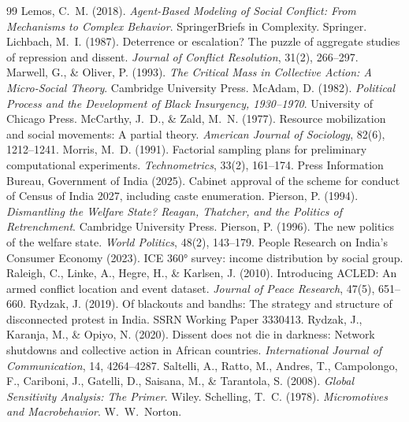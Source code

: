 \documentclass[11pt,a4paper]{article}
\begin{document}
\begin{thebibliography}{99}
 Lemos, C.~M. (2018). \emph{Agent-Based Modeling of Social Conflict: From Mechanisms to Complex Behavior}. SpringerBriefs in Complexity. Springer.
 Lichbach, M.~I. (1987). Deterrence or escalation? The puzzle of aggregate studies of repression and dissent. \emph{Journal of Conflict Resolution}, 31(2), 266--297.
 Marwell, G., \& Oliver, P. (1993). \emph{The Critical Mass in Collective Action: A Micro-Social Theory}. Cambridge University Press.
 McAdam, D. (1982). \emph{Political Process and the Development of Black Insurgency, 1930--1970}. University of Chicago Press.
 McCarthy, J.~D., \& Zald, M.~N. (1977). Resource mobilization and social movements: A partial theory. \emph{American Journal of Sociology}, 82(6), 1212--1241.
 Morris, M.~D. (1991). Factorial sampling plans for preliminary computational experiments. \emph{Technometrics}, 33(2), 161--174.
 Press Information Bureau, Government of India (2025). Cabinet approval of the scheme for conduct of Census of India 2027, including caste enumeration.
 Pierson, P. (1994). \emph{Dismantling the Welfare State? Reagan, Thatcher, and the Politics of Retrenchment}. Cambridge University Press.
 Pierson, P. (1996). The new politics of the welfare state. \emph{World Politics}, 48(2), 143--179.
 People Research on India's Consumer Economy (2023). ICE 360° survey: income distribution by social group.
 Raleigh, C., Linke, A., Hegre, H., \& Karlsen, J. (2010). Introducing ACLED: An armed conflict location and event dataset. \emph{Journal of Peace Research}, 47(5), 651--660.
 Rydzak, J. (2019). Of blackouts and bandhs: The strategy and structure of disconnected protest in India. SSRN Working Paper 3330413.
 Rydzak, J., Karanja, M., \& Opiyo, N. (2020). Dissent does not die in darkness: Network shutdowns and collective action in African countries. \emph{International Journal of Communication}, 14, 4264--4287.
 Saltelli, A., Ratto, M., Andres, T., Campolongo, F., Cariboni, J., Gatelli, D., Saisana, M., \& Tarantola, S. (2008). \emph{Global Sensitivity Analysis: The Primer}. Wiley.
 Schelling, T.~C. (1978). \emph{Micromotives and Macrobehavior}. W.~W.~Norton.

\end{thebibliography}
\end{document}
